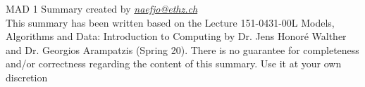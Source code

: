 



\maketitle
\begin{center}
MAD 1 Summary created by \href{mailto:naefjo@ethz.ch}{\textit{naefjo@ethz.ch}}\\
This summary has been written based on the Lecture 151-0431-00L Models, Algorithms and Data: Introduction to Computing by Dr. Jens Honoré Walther and Dr. Georgios Arampatzis (Spring 20). There is no guarantee for completeness and/or correctness regarding the content of this summary. Use it at your own discretion
\end{center}
\newpage

\begin{center}
    \begin{multicols*}{2}
        \tableofcontents
    \end{multicols*}
\end{center}

